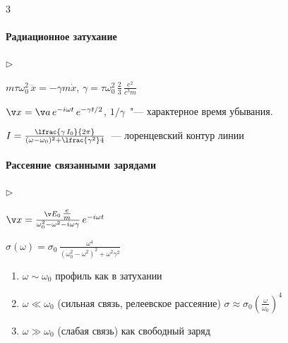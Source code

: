 \documentclass{trchesh}
\newenvironment{facts}{\begin{list}{$\triangleright$}{}}{\end{list}}
\begin{document}
\begin{multicols*}{3}
\paragraph{Радиационное затухание}
\begin{facts}
\item $m \tau \omega_0^2 \, \dddot{x} = - \gamma m \dot x$, $\gamma = \tau \omega_0^2 \,\frac{2}{3}\, \frac{e^2}{c^3m}$
\item $\v x = \v a \, e^{-i \omega t}\, e^{-\gamma t/2}$, $1/\gamma$~"--- характерное время убывания. 
\item $I = \frac{\lfrac{\gamma\, I_0}{2\pi}}{(\omega - \omega_0)^2 + \lfrac{\gamma^2} 4}$~--- лоренцевский контур линии
\end{facts}
\noindent
{}

\paragraph{Рассеяние связанными зарядами}

\begin{facts}
\item $\v x= \frac{\v E_0 \, \tfrac e m}{\omega_0^2 - \omega^2 - i \omega \gamma}\, e^{-i \omega t}$
\item $\sigma (\omega) = \sigma_0 \, \frac{\omega ^4}{(\omega_0^2 - \omega^2)^2 + \omega^2 \gamma^2} $
\end{facts}

\begin{enumerate}
  \item $\omega \sim \omega_0$ профиль как в затухании
  \item $\omega \ll \omega_0$ (сильная связь, релеевское рассеяние) $\sigma \approx \sigma_0 \left(\frac \omega {\omega_0}\right)^4$
  \item $\omega \gg \omega_0$ (слабая связь) как свободный заряд
\end{enumerate}
\end{multicols*}
\end{document}
